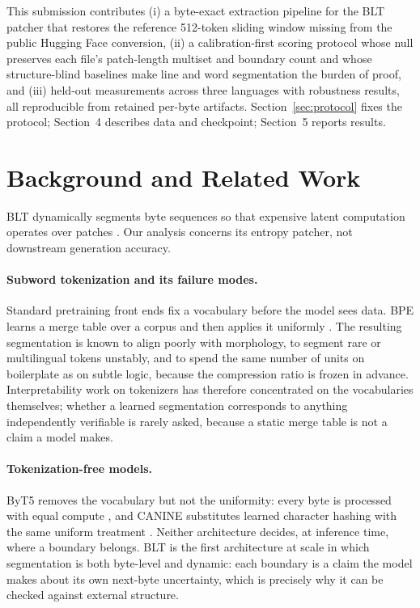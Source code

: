 This submission contributes (i) a byte-exact extraction pipeline for the BLT patcher that restores the reference 512-token sliding window missing from the public Hugging Face conversion, (ii) a calibration-first scoring protocol whose null preserves each file's patch-length multiset and boundary count and whose structure-blind baselines make line and word segmentation the burden of proof, and (iii) held-out measurements across three languages with robustness results, all reproducible from retained per-byte artifacts. Section~\ref{sec:protocol} fixes the protocol; Section~4 describes data and checkpoint; Section~5 reports results.

\section{Background and Related Work}
BLT dynamically segments byte sequences so that expensive latent computation operates over patches \citep{pagnoni-etal-2025-byte}. Our analysis concerns its entropy patcher, not downstream generation accuracy.

\paragraph{Subword tokenization and its failure modes.}
Standard pretraining front ends fix a vocabulary before the model sees data. BPE learns a merge table over a corpus and then applies it uniformly \citep{sennrich-etal-2016-neural}. The resulting segmentation is known to align poorly with morphology, to segment rare or multilingual tokens unstably, and to spend the same number of units on boilerplate as on subtle logic, because the compression ratio is frozen in advance. Interpretability work on tokenizers has therefore concentrated on the vocabularies themselves; whether a learned segmentation corresponds to anything independently verifiable is rarely asked, because a static merge table is not a claim a model makes.

\paragraph{Tokenization-free models.}
ByT5 removes the vocabulary but not the uniformity: every byte is processed with equal compute \citep{xue-etal-2022-byt5}, and CANINE substitutes learned character hashing with the same uniform treatment \citep{clark-etal-2022-canine}. Neither architecture decides, at inference time, where a boundary belongs. BLT is the first architecture at scale in which segmentation is both byte-level and dynamic: each boundary is a claim the model makes about its own next-byte uncertainty, which is precisely why it can be checked against external structure.

